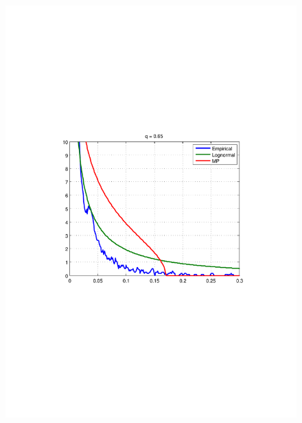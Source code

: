 \documentclass{article}
\begin{document}
\begin{figure}[htb!]
{    \includegraphics[scale=0.33, clip=true, trim=115 271 109
    204]{../pics/spectral_density_q0dot65.pdf}
  }
  \subfigure[q = 0.8, v=0.8808, KL=0.14]{
}
\end{figure}
\end{document}
